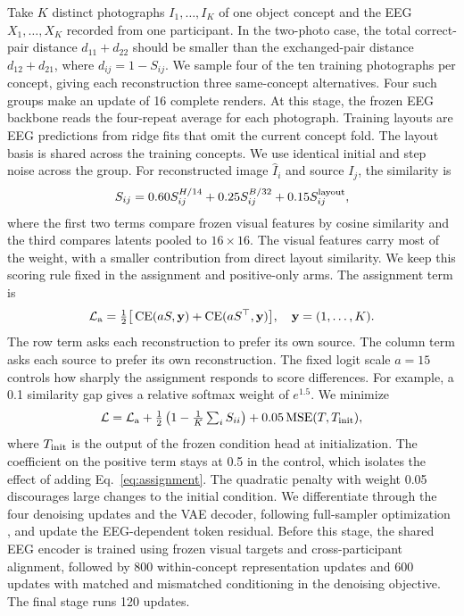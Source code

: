 \documentclass[letterpaper,10pt,conference]{IEEEtran}
\newcommand{\CE}{\operatorname{CE}}
\begin{document}
Take \(K\) distinct photographs \(I_1,\ldots,I_K\) of one object concept and the EEG \(X_1,\ldots,X_K\) recorded from one participant. In the two-photo case, the total correct-pair distance \(d_{11}+d_{22}\) should be smaller than the exchanged-pair distance \(d_{12}+d_{21}\), where \(d_{ij}=1-S_{ij}\). We sample four of the ten training photographs per concept, giving each reconstruction three same-concept alternatives. Four such groups make an update of 16 complete renders. At this stage, the frozen EEG backbone reads the four-repeat average for each photograph. Training layouts are EEG predictions from ridge fits that omit the current concept fold. The layout basis is shared across the training concepts. We use identical initial and step noise across the group. For reconstructed image \(\widehat I_i\) and source \(I_j\), the similarity is
\begin{equation}
S_{ij}=0.60 S^{H/14}_{ij}+0.25 S^{B/32}_{ij}+0.15 S^{\rm layout}_{ij},
\label{eq:similarity}
\end{equation}
where the first two terms compare frozen visual features by cosine similarity and the third compares latents pooled to \(16\times16\). The visual features carry most of the weight, with a smaller contribution from direct layout similarity. We keep this scoring rule fixed in the assignment and positive-only arms. The assignment term is
\begin{equation}
\mathcal L_{\rm a}=\tfrac12\big[\CE(a S,\mathbf y)+\CE(a S^\top,\mathbf y)\big],
\quad \mathbf y=(1,\ldots,K).
\label{eq:assignment}
\end{equation}
The row term asks each reconstruction to prefer its own source. The column term asks each source to prefer its own reconstruction. The fixed logit scale \(a=15\) controls how sharply the assignment responds to score differences. For example, a 0.1 similarity gap gives a relative softmax weight of \(e^{1.5}\). We minimize
\begin{equation}
\mathcal L=\mathcal L_{\rm a}+
\tfrac12\left(1-\tfrac1K\textstyle\sum_i S_{ii}\right)
+0.05\operatorname{MSE}(T,T_{\rm init}),
\label{eq:train}
\end{equation}
where \(T_{\rm init}\) is the output of the frozen condition head at initialization. The coefficient on the positive term stays at 0.5 in the control, which isolates the effect of adding Eq.~\eqref{eq:assignment}. The quadratic penalty with weight 0.05 discourages large changes to the initial condition. We differentiate through the four denoising updates and the VAE decoder, following full-sampler optimization \cite{clark2024}, and update the EEG-dependent token residual. Before this stage, the shared EEG encoder is trained using frozen visual targets and cross-participant alignment, followed by 800 within-concept representation updates and 600 updates with matched and mismatched conditioning in the denoising objective. The final stage runs 120 updates.
\end{document}
